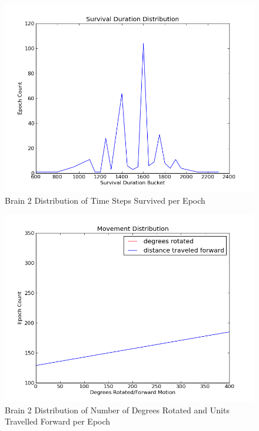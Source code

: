 \documentclass[a4paper,11pt]{article}
\begin{document}
\begin{figure}
\begin{center}
  \includegraphics[scale=1.0]{img/brain2/survivalGauss-435.55.png}
  \caption{Brain 2 Distribution of Time Steps Survived per Epoch}
  \label{fig:b2survive}
\end{center}
\end{figure}

\begin{figure}
\begin{center}
  \includegraphics[scale=1.0]{img/brain2/travelGauss-r0.00-d200.00.png}
  \caption{Brain 2 Distribution of Number of Degrees Rotated and Units Travelled Forward per Epoch}
  \label{fig:b2travel}
\end{center}
\end{figure}
\end{document}
